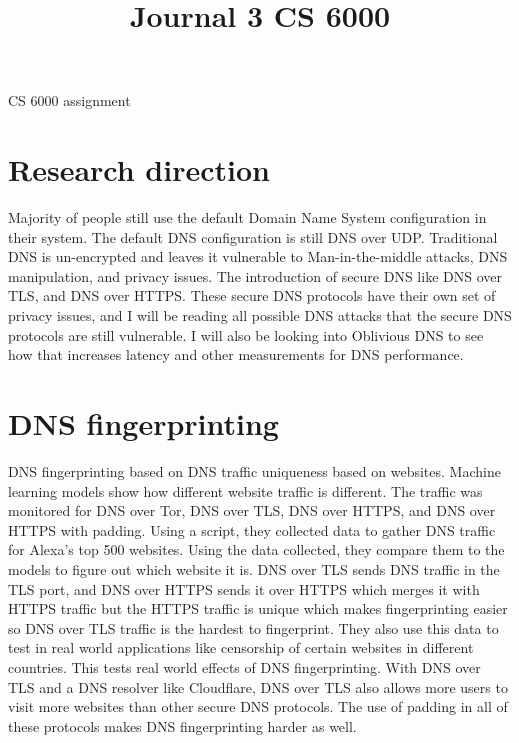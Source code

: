 \documentclass[10pt,conference]{IEEEtran}
\begin{document}
\title{Journal 3 CS 6000}



\maketitle



\begin{IEEEkeywords}
CS 6000 assignment
\end{IEEEkeywords}
\section{Research direction}
\label{sec:Research direction}
Majority of people still use the default Domain Name System configuration in their system. The default DNS configuration is still DNS over UDP. Traditional DNS is un-encrypted and leaves it vulnerable to Man-in-the-middle attacks, DNS manipulation, and privacy issues. The introduction of secure DNS like DNS over TLS, and DNS over HTTPS. These secure DNS protocols have their own set of privacy issues, and I will be reading all possible DNS attacks that the secure DNS protocols are still vulnerable. I will also be looking into Oblivious DNS to see how that increases latency and other measurements for DNS performance.

\section{DNS fingerprinting \cite{siby2019encrypted}}
DNS fingerprinting based on DNS traffic uniqueness based on websites. Machine learning models show how different website traffic is different. The traffic was monitored for DNS over Tor, DNS over TLS, DNS over HTTPS, and DNS over HTTPS with padding. Using a script, they collected data to gather DNS traffic for Alexa's top 500 websites. Using the data collected, they compare them to the models to figure out which website it is. DNS over TLS sends DNS traffic in the TLS port, and DNS over HTTPS sends it over HTTPS which merges it with HTTPS traffic but the HTTPS traffic is unique which makes fingerprinting easier so DNS over TLS traffic is the hardest to fingerprint. They also use this data to test in real world applications like censorship of certain websites in different countries. This tests real world effects of DNS fingerprinting. With DNS over TLS and a DNS resolver like Cloudflare, DNS over TLS also allows more users to visit more websites than other secure DNS protocols. The use of padding in all of these protocols makes DNS fingerprinting harder as well. 
\end{document}
